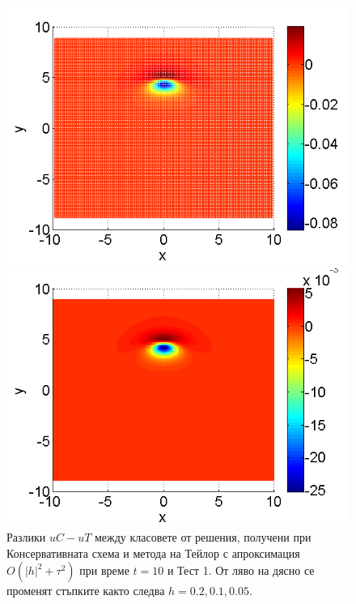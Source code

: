 \documentclass[a4paper]{article}
\theoremstyle{remark}
\begin{document}
\begin{large}
\begin{figure}[ht]
\begin{minipage}[b]{0.32\linewidth}
		\includegraphics[width=\linewidth]{SolutionDiff/TaylorZeroBndVsEnergySave_30_ZB2_bt3_c045_h010_O(h^2).png}
	\end{minipage}	
	\begin{minipage}[b]{0.32\linewidth}		
		\includegraphics[width=\linewidth]{SolutionDiff/TaylorZeroBndVsEnergySave_30_ZB2_bt3_c045_h005_O(h^2).png}
	\end{minipage}
\caption{Разлики $uC - uT$ между класовете от решения, получени при Консервативната схема и метода на Тейлор с апроксимация $O(|h|^2 + \tau^2)$ при време $t=10$ и Тест 1. От ляво на дясно се променят стъпките както следва $h=0.2, 0.1, 0.05$.}
\label{Test1_Diff}
\end{figure}
\FloatBarrier

\end{large}
\end{document}
